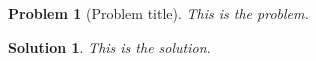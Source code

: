 \documentclass[UTF8,10pt,a4paper]{article}
\theoremstyle{Problem}%
\newtheorem{prob}{Problem}%
\theoremstyle{Solution}%
\newtheorem*{sol}{Solution}%
\begin{document}
\thispagestyle{FirstPageStyle}%
\begin{prob}[Problem title]
    This is the problem.
\end{prob}
\begin{sol}
    This is the solution.
\end{sol}
\end{document}
